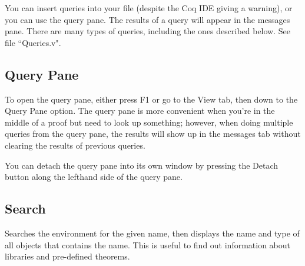 
You can insert queries into your file (despite the Coq IDE giving a warning), or you can use the query pane. 
The results of a query will appear in the messages pane.
There are many types of queries, including the ones described below. 
See file ``Queries.v".

\subsection{Query Pane} \label{query_pane}
To open the query pane, either press F1 or go to the View tab, then down to the Query Pane option. 
The query pane is more convenient when you're in the middle of a proof but need to look up something; 
however, when doing multiple queries from the query pane, the results will show up in the messages tab without clearing the results of previous queries.

\begin{figure}[!h]
\end{figure}

\noindent
You can detach the query pane into its own window by pressing the Detach button along the lefthand side of the query pane.





\newpage
\subsection{Search} \label{search}
Searches the environment for the given name, then displays the name and type of all objects that contains the name. 
This is useful to find out information about libraries and pre-defined theorems. 

